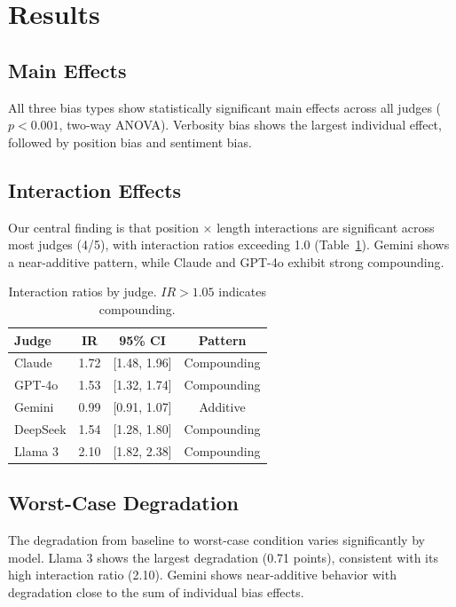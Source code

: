 \documentclass[11pt,twocolumn]{article}
\begin{document}
\section{Results}

\subsection{Main Effects}

All three bias types show statistically significant main effects across all judges ($p < 0.001$, two-way ANOVA). Verbosity bias shows the largest individual effect, followed by position bias and sentiment bias.

\subsection{Interaction Effects}

Our central finding is that position $\times$ length interactions are significant across most judges (4/5), with interaction ratios exceeding 1.0 (Table~\ref{tab:interactions}). Gemini shows a near-additive pattern, while Claude and GPT-4o exhibit strong compounding.

\begin{table}[h]
\centering
\caption{Interaction ratios by judge. $IR > 1.05$ indicates compounding.}
\label{tab:interactions}
\begin{tabular}{lccc}
\toprule
Judge & IR & 95\% CI & Pattern \\
\midrule
Claude & 1.72 & [1.48, 1.96] & Compounding \\
GPT-4o & 1.53 & [1.32, 1.74] & Compounding \\
Gemini & 0.99 & [0.91, 1.07] & Additive \\
DeepSeek & 1.54 & [1.28, 1.80] & Compounding \\
Llama 3 & 2.10 & [1.82, 2.38] & Compounding \\
\bottomrule
\end{tabular}
\end{table}

\subsection{Worst-Case Degradation}

The degradation from baseline to worst-case condition varies significantly by model. Llama 3 shows the largest degradation (0.71 points), consistent with its high interaction ratio (2.10). Gemini shows near-additive behavior with degradation close to the sum of individual bias effects.
\end{document}
